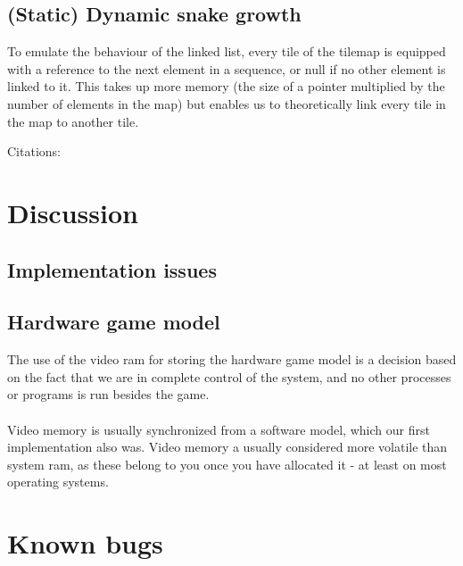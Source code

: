 \documentclass{acm_proc_article-sp}
\begin{document}
\subsection{(Static) Dynamic snake growth}
To emulate the behaviour of the linked list, every tile of the tilemap is equipped with a reference to the next element in a sequence, or null if no other element is linked to it. This takes up more memory (the size of a pointer multiplied by the number of elements in the map) but enables us to theoretically link every tile in the map to another tile.

Citations: \cite{patt2000introduction} \cite{chu2008fpga}

\section{Discussion}

\subsection{Implementation issues}

\subsection{Hardware game model}
The use of the video ram for storing the hardware game model is a decision based on the fact that we are in complete control of the system, and no other processes or programs is run besides the game.\\\\
Video memory is usually synchronized from a software model, which our first implementation also was. Video memory a usually considered more volatile than system ram, as these belong to you once you have allocated it - at least on most operating systems.


\appendix


%
%
\section{Known bugs}
\end{document}
